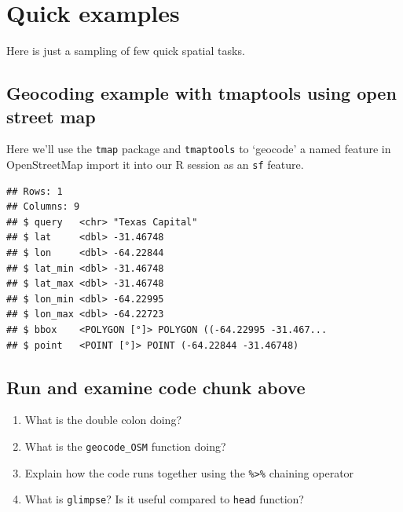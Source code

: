 \documentclass[
]{book}
\newenvironment{Shaded}{\begin{snugshade}}{\end{snugshade}}
\newcommand{\CommentTok}[1]{\textcolor[rgb]{0.56,0.35,0.01}{\textit{#1}}}
\newcommand{\DataTypeTok}[1]{\textcolor[rgb]{0.13,0.29,0.53}{#1}}
\newcommand{\KeywordTok}[1]{\textcolor[rgb]{0.13,0.29,0.53}{\textbf{#1}}}
\newcommand{\NormalTok}[1]{#1}
\newcommand{\OperatorTok}[1]{\textcolor[rgb]{0.81,0.36,0.00}{\textbf{#1}}}
\newcommand{\OtherTok}[1]{\textcolor[rgb]{0.56,0.35,0.01}{#1}}
\newcommand{\StringTok}[1]{\textcolor[rgb]{0.31,0.60,0.02}{#1}}
\providecommand{\tightlist}{%
  \setlength{\itemsep}{0pt}\setlength{\parskip}{0pt}}
\begin{document}
\hypertarget{quick-examples}{%
\section{Quick examples}\label{quick-examples}}

Here is just a sampling of few quick spatial tasks.

\hypertarget{geocoding-example-with-tmaptools-using-open-street-map}{%
\subsection{Geocoding example with tmaptools using open street map}\label{geocoding-example-with-tmaptools-using-open-street-map}}

Here we'll use the \texttt{tmap} package and \texttt{tmaptools} to `geocode' a named feature in OpenStreetMap import it into our R session as an \texttt{sf} feature.

\begin{Shaded}
\end{Shaded}

\begin{verbatim}
## Rows: 1
## Columns: 9
## $ query   <chr> "Texas Capital"
## $ lat     <dbl> -31.46748
## $ lon     <dbl> -64.22844
## $ lat_min <dbl> -31.46748
## $ lat_max <dbl> -31.46748
## $ lon_min <dbl> -64.22995
## $ lon_max <dbl> -64.22723
## $ bbox    <POLYGON [°]> POLYGON ((-64.22995 -31.467...
## $ point   <POINT [°]> POINT (-64.22844 -31.46748)
\end{verbatim}

\hypertarget{run-and-examine-code-chunk-above}{%
\subsection{Run and examine code chunk above}\label{run-and-examine-code-chunk-above}}

\begin{enumerate}
\def\labelenumi{\arabic{enumi}.}
\tightlist
\item
  What is the double colon doing?
\item
  What is the \texttt{geocode\_OSM} function doing?
\item
  Explain how the code runs together using the \texttt{\%\textgreater{}\%} chaining operator
\item
  What is \texttt{glimpse}? Is it useful compared to \texttt{head} function?
\end{enumerate}
\end{document}
